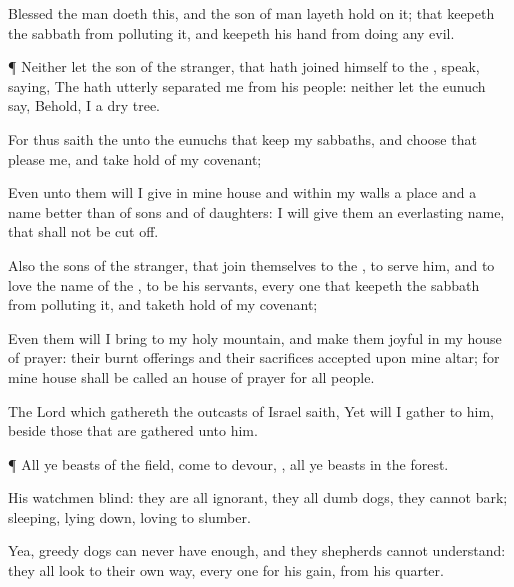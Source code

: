 {Blessed
{} the
man
{}
doeth this, and the
son of
man
{} layeth
hold on it; that
keepeth the
sabbath from
polluting it, and
keepeth his
hand from
doing any
evil.


\par }{\PP {}¶ Neither let the
son of the
stranger, that hath
joined himself to the
{},
speak,
saying, The
{} hath
utterly
separated me from his
people: neither let the
eunuch
say, Behold, I
{} a
dry
tree.

For thus
saith the
{} unto the
eunuchs that
keep my
sabbaths, and
choose
{} that
please me, and take
hold of my
covenant;

Even unto them will I
give in mine
house and within my
walls a
place and a
name
better than of
sons and of
daughters: I will
give them an
everlasting
name, that shall not be cut
off.

Also the
sons of the
stranger, that
join themselves to the
{}, to
serve him, and to
love the
name of the
{}, to be his
servants, every one that
keepeth the
sabbath from
polluting it, and taketh
hold of my
covenant;

Even them will I
bring to my
holy
mountain, and make them
joyful in my
house of
prayer: their burnt
offerings and their
sacrifices
{}
accepted upon mine
altar; for mine
house shall be
called an
house of
prayer for all
people.

The
Lord
{} which
gathereth the
outcasts of
Israel
saith, Yet will I
gather
{} to him, beside those that are
gathered unto him.


\par }{\PP {}¶ All ye
beasts of the
field,
come to
devour,
{}, all ye
beasts in the
forest.

His
watchmen
{}
blind: they are all
ignorant, they
{} all
dumb
dogs, they
cannot
bark;
sleeping, lying
down,
loving to
slumber.

Yea,
{}
greedy
dogs
{}
can never
have
enough, and they
{}
shepherds
{} cannot
understand: they all
look to their own
way, every
one for his
gain, from his
quarter.

}

